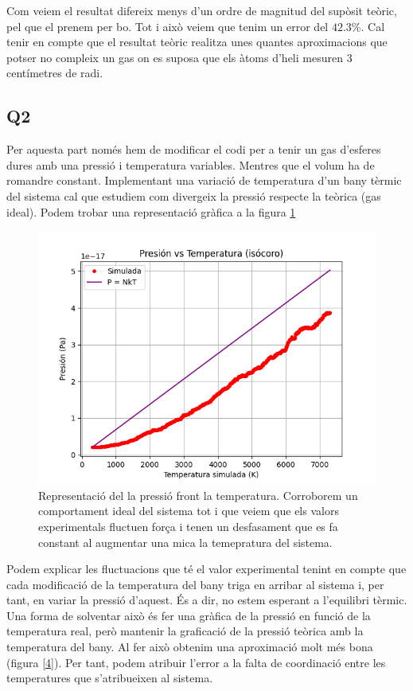 \documentclass{article}
\begin{document}
	Com veiem el resultat difereix menys d'un ordre de magnitud del supòsit teòric, pel que el prenem per bo. Tot i això veiem que tenim un error del $42.3\%$. Cal tenir en compte que el resultat teòric realitza unes quantes aproximacions que potser no compleix un gas on es suposa que els àtoms d'heli mesuren $3$ centímetres de radi. 
	
	
	\subsection*{Q2}
	
	Per aquesta part només hem de modificar el codi per a tenir un gas d'esferes dures amb una pressió i temperatura variables. Mentres que el volum ha de romandre constant. Implementant una variació de temperatura d'un bany tèrmic del sistema cal que estudiem com divergeix la pressió respecte la teòrica (gas ideal). Podem trobar una representació gràfica a la figura \ref{labe}
	
	\begin{figure}[h!]
	\centering
	\includegraphics[width=0.7\linewidth]{Q2.png}
	\caption{Representació del la pressió front la temperatura. Corroborem un comportament ideal del sistema tot i que veiem que els valors experimentals fluctuen força i tenen un desfasament que es fa constant al augmentar una mica la temepratura del sistema.}
	\label{labe}
	\end{figure}
	Podem explicar les fluctuacions que té el valor experimental tenint en compte que cada modificació de la temperatura del bany triga en arribar al sistema i, per tant, en variar la pressió d'aquest. És a dir, no estem esperant a l'equilibri tèrmic. Una forma de solventar això és fer una gràfica de la pressió en funció de la temperatura real, però mantenir la graficació de la pressió teòrica amb la temperatura del bany. Al fer això obtenim una aproximació molt més bona (figura \ref{4}). Per tant, podem atribuir l'error a la falta de coordinació entre les temperatures que s'atribueixen al sistema. 
	
\end{document}
